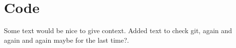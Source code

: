 

\chapter{Code}

Some text would be nice to give context.
Added text to check git, again and again and again maybe for the last time?.

